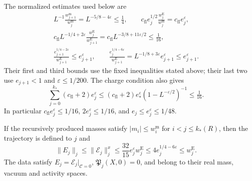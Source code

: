 The normalized estimates used below are
\begin{equation}\label{eq:rgfl-window-estimates}
 \begin{gathered}
 L^{-1}\frac{w_{j+1}^{\mathrm m}}{w_j^{\mathrm m}}
                  =L^{-5/8-4\varepsilon}\le\tfrac14,\qquad
 c_{\mathrm{fl}}e_j^{1/2}
          \frac{w_j^{\mathrm E}}{w_j^{\mathrm m}}
                           =c_{\mathrm{fl}}e_j^\varepsilon,\\
 c_{\mathrm{fl}}L^{-1/4+2\varepsilon}
          \frac{w_j^{\mathrm E}}{w_{j+1}^{\mathrm E}}
                     =c_{\mathrm{fl}}L^{-3/8+11\varepsilon/2}
                                                        \le\tfrac1{16},\\
 \frac{e_{j+1}^{1/4-2\varepsilon}}{w_{j+1}^{\mathrm E}}
                                      \le e_{j+1}^\varepsilon,\qquad
 \frac{e_j^{1/4-6\varepsilon}}{w_{j+1}^{\mathrm E}}
             =L^{-1/8+3\varepsilon}e_{j+1}^\varepsilon
                                      \le e_{j+1}^\varepsilon .
 \end{gathered}
\end{equation}
Their first and third bounds use the fixed inequalities
stated above; their last two use $e_{j+1}<1$ and
$\varepsilon\le1/200$.
The charge condition also gives
\begin{equation}\label{eq:rgfl-summable-charge}
 \sum_{j=0}^{k_*}(c_{\mathrm{fl}}+2)e_j^\varepsilon
             \le(c_{\mathrm{fl}}+2)e_*^\varepsilon
                          (1-L^{-\varepsilon/2})^{-1}
                                                        \le\tfrac1{16}.
\end{equation}
In particular
$c_{\mathrm{fl}}e_j^\varepsilon\le1/16$,
$2e_j^\varepsilon\le1/16$, and
$e_j\le e_j^\varepsilon\le1/48$.

\begin{proposition}\label{prop:rgfl-continuation}
If the recursively produced masses satisfy
$|m_i|\le w_i^{\mathrm m}$ for $i<j\le k_*(R)$,
then the trajectory is defined to $j$ and
\begin{equation}\label{eq:rgfl-activity-bound}
 \|E_j\|_j\le\|\mathscr E_j\|_j^x
       \le\frac{32}{15}e_j^\varepsilon w_j^{\mathrm E}
       \le4e_j^{1/4-6\varepsilon}\le w_j^{\mathrm E}.
\end{equation}
The data satisfy
$E_j=\mathscr E_j|_{\mathscr C=0}$,
$\mathfrak P_j(X,0)=0$, and belong to their real
mass, vacuum and activity spaces.
\end{proposition}

